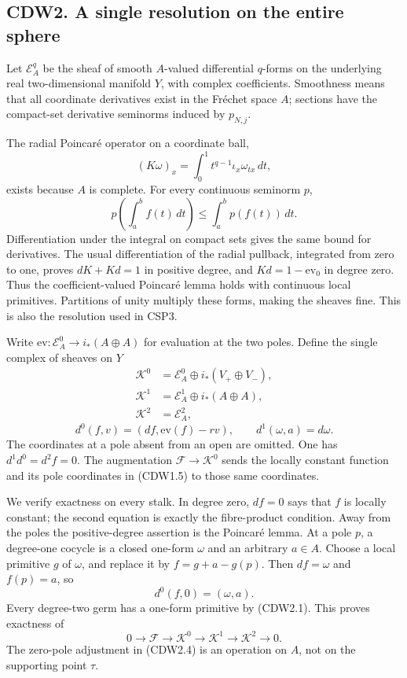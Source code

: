 \subsection{CDW2. A single resolution on the entire
sphere}\label{cdw2.-a-single-resolution-on-the-entire-sphere}

Let \(\mathscr E_A^q\) be the sheaf of smooth \(A\)-valued differential
\(q\)-forms on the underlying real two-dimensional manifold \(Y\), with
complex coefficients. Smoothness means that all coordinate derivatives
exist in the Fréchet space \(A\); sections have the compact-set
derivative seminorms induced by \(p_{N,j}\).

The radial Poincaré operator on a coordinate ball, \[
(K\omega)_x=\int_0^1 t^{q-1}\iota_x\omega_{tx}\,dt,
\tag{CDW2.1}
\] exists because \(A\) is complete. For every continuous seminorm
\(p\), \[
p\left(\int_a^b f(t)\,dt\right)\le\int_a^b p(f(t))\,dt.
\tag{CDW2.2}
\] Differentiation under the integral on compact sets gives the same
bound for derivatives. The usual differentiation of the radial pullback,
integrated from zero to one, proves \(dK+Kd=1\) in positive degree, and
\(Kd=1-\mathrm{ev}_0\) in degree zero. Thus the coefficient-valued
Poincaré lemma holds with continuous local primitives. Partitions of
unity multiply these forms, making the sheaves fine. This is also the
resolution used in CSP3.

Write \(\mathrm{ev}:\mathscr E_A^0\to i_*(A\oplus A)\) for evaluation at
the two poles. Define the single complex of sheaves on \(Y\) \[
\begin{aligned}
\mathscr K^0&=\mathscr E_A^0\oplus i_*(V_+\oplus V_-),\\
\mathscr K^1&=\mathscr E_A^1\oplus i_*(A\oplus A),\\
\mathscr K^2&=\mathscr E_A^2,
\end{aligned}
\] \[
d^0(f,v)=(df,\mathrm{ev}(f)-rv),\qquad
d^1(\omega,a)=d\omega.
\tag{CDW2.3}
\] The coordinates at a pole absent from an open are omitted. One has
\(d^1d^0=d^2f=0\). The augmentation \(\mathscr F\to\mathscr K^0\) sends
the locally constant function and its pole coordinates in (CDW1.5) to
those same coordinates.

We verify exactness on every stalk. In degree zero, \(df=0\) says that
\(f\) is locally constant; the second equation is exactly the
fibre-product condition. Away from the poles the positive-degree
assertion is the Poincaré lemma. At a pole \(p\), a degree-one cocycle
is a closed one-form \(\omega\) and an arbitrary \(a\in A\). Choose a
local primitive \(g\) of \(\omega\), and replace it by \(f=g+a-g(p)\).
Then \(df=\omega\) and \(f(p)=a\), so \[
d^0(f,0)=(\omega,a).
\tag{CDW2.4}
\] Every degree-two germ has a one-form primitive by (CDW2.1). This
proves exactness of \[
0\to\mathscr F\to\mathscr K^0\to\mathscr K^1\to\mathscr K^2\to0.
\tag{CDW2.5}
\] The zero-pole adjustment in (CDW2.4) is an operation on \(A\), not on
the supporting point \(\tau\).

